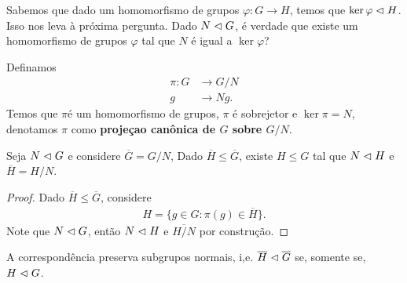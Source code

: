 Sabemos que dado um homomorfismo de grupos $\varphi:G\to H$, temos que $\ker\varphi\vartriangleleft H$.\\
Isso nos leva à próxima pergunta. Dado $N\vartriangleleft G$, é verdade que existe um homomorfismo de grupos $\varphi$ tal que $N$ é igual a $\ker\varphi$?
\begin{definition}
  Definamos
  \begin{align*}
    \pi:G&\to G/N\\
    g&\to Ng.
  \end{align*}
  Temos que $\pi$é um homomorfismo de grupos, $\pi$ é sobrejetor e $\ker\pi=N$, denotamos $\pi$ como \textbf{projeçao canônica de $G$ sobre $G/N$}. 
\end{definition}
\begin{theorem}
  Seja $N\vartriangleleft G$ e considere $\overline{G}=G/N$, Dado $\overline{H}\leq \overline{G}$, existe $H\leq G$ tal que $N\vartriangleleft H$ e $\overline{H}=H/N$.
  \begin{center}
     
  \end{center}
\end{theorem}
\begin{proof} 
  Dado $\overline{H}\leq \overline{G}$, considere
  \begin{align*}
    H=\{g\in G: \pi(g)\in \overline{H}\}.
  \end{align*}
  Note que $N\vartriangleleft G$, então $N\vartriangleleft H$ e $\overline{H/N}$ por construção. 
\end{proof}
A correspondência preserva subgrupos normais, i,e. $\overline{H}\vartriangleleft \overline{G}$ se, somente se, $H\vartriangleleft G$.

